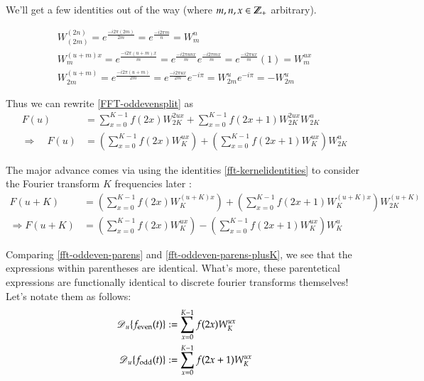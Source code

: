 	We'll get a few identities out of the way (where $m, n, x \in \mathbb{Z}_{+}$ arbitrary).
	
	\begin{gather} \label{fft-kernelidentities}
	W_{(2m)}^{(2n)} = e^{\frac{-i2\pi(2m)}{2m}} = e^{\frac{-i2\pi m}{n}} = W_{m}^{n} \\
	W_{m}^{(u+m)x} = e^{\frac{-i2\pi(u+m)x}{m} } = e^{\frac{-i2\pi unx}{m}} e^{\frac{-i2\pi mx}{m}}
				= e^{\frac{-i2\pi ux }{m}} (1) = W_m^{ux} \\
	W_{2m}^{(u+m)} = e^{\frac{-i2\pi(u+m)}{2m}} = e^{\frac{-i2\pi ux}{2m}} e^{-i\pi}
			 = W_{2m}^{u} e^{-i\pi} = - W_{2m}^{u}
	\end{gather}

Thus we can rewrite \cref{FFT-oddevensplit} as
\begin{align}
F(u)  &= \sum_{x=0}^{K-1} f(2x) W_{2K}^{2ux} + \sum_{x=0}^{K-1} f(2x+1) W_{2K}^{2ux} W_{2K}^{u} \\
\Longrightarrow \quad F(u) &= \left(\sum_{x=0}^{K-1} f(2x) W_{K}^{ux}\right)
+ \left(\sum_{x=0}^{K-1} f(2x+1) W_{K}^{ux}\right) W_{2K}^{u}
 \label{fft-oddeven-parens}
\end{align} 

The major advance comes via using the identities \cref{fft-kernelidentities}  to consider the Fourier transform $K$ 
frequencies later :
\begin{align}
F(u+K) &= \left(\sum_{x=0}^{K-1} f(2x) W_{K}^{(u+K)x}\right)
+ \left(\sum_{x=0}^{K-1} f(2x+1) W_{K}^{(u+K)x}\right) W_{2K}^{(u+K)}\\
\Longrightarrow F(u+K) &= \left(\sum_{x=0}^{K-1} f(2x) W_{K}^{ux}\right)-\left(\sum_{x=0}^{K-1} f(2x+1)W_K^{ux}\right) W_K^{u}
\label{fft-oddeven-parens-plusK}
\end{align}


Comparing \cref{fft-oddeven-parens} and \cref{fft-oddeven-parens-plusK}, we see that the expressions within parentheses are identical.
What's more, these parentetical expressions are functionally identical to discrete fourier transforms themselves! Let's notate them as follows:
\begin{align} \label{fft-oddeven-subdfts}
\operatorname{\mathscr{D}}_u\{f_{\mathrm{even}}(t)\} &:= \sum_{x=0}^{K-1} f(2x)W_K^{ux} \\
\operatorname{\mathscr{D}}_u\{f_{\mathrm{odd}}(t)\} &:= \sum_{x=0}^{K-1} f(2x+1)W_K^{ux}
\end{align}

